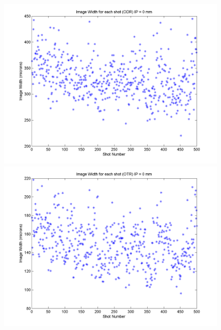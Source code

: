\documentclass[12pt]{article}
\begin{document}
\begin{figure}
\begin{center}
\includegraphics[scale=0.5]{Figures/ImageWidth_ODR_0.PNG}
\includegraphics[scale=0.5]{Figures/ImageWidth_OTR_0.PNG}
\caption{}
\end{center}
\end{figure}
\end{document}

